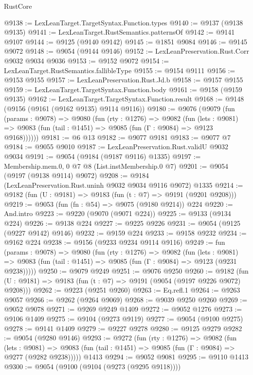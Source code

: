 \begin{lexlean}{RustCore}
\begin{coremodule}
@9138 := LexLeanTarget.TargetSyntax.Function.types
@9140 := @9137 (@9138 @9135)
@9141 := LexLeanTarget.RustSemantics.patternsOf
@9142 := @9141 @9107
@9144 := @9125 (@9140 @9142)
@9145 := @1851 @9084
@9146 := @9145 @9072
@9148 := @9054 (@9144 @9146)
@9152 := LexLeanPreservation.Rust.Corr @9032 @9034 @9036
@9153 := @9152 @9072
@9154 := LexLeanTarget.RustSemantics.fallibleType
@9155 := @9154 @9111
@9156 := @9153 @9155
@9157 := LexLeanPreservation.Rust.Jd.b
@9158 := @9157 @9155
@9159 := LexLeanTarget.TargetSyntax.Function.body
@9161 := @9158 (@9159 @9135)
@9162 := LexLeanTarget.TargetSyntax.Function.result
@9168 := @9148 (@9156 (@9161 (@9162 @9135) @9114 @9116))
@9180 := @9076
    (@9079
      (fun (params : @9078) =>
      @9080
        (fun (rty : @1276) =>
        @9082
          (fun (lets : @9081) =>
          @9083 (fun (tail : @1451) => @9085 (fun (Γ : @9084) => @9123 @9168))))))
@9181 := @6 @13
@9182 := @9077 @9181
@9183 := @9077 @7
@9184 := @9055 @9010
@9187 := LexLeanPreservation.Rust.validU @9032 @9034
@9191 := @9054 (@9184 (@9187 @9116) @1335)
@9197 := Membership.mem.{0, 0} @7 @8 (List.instMembership.{0} @7)
@9201 := @9054 (@9197 (@9138 @9114) @9072)
@9208 := @9184 (LexLeanPreservation.Rust.uninh @9032 @9034 @9116 @9072) @1335
@9214 := @9182 (fun (U : @9181) => @9183 (fun (t : @7) => @9191 (@9201 @9208)))
@9219 := @9053 (fun (fn : @54) => @9075 (@9180 @9214)) @224
@9220 := And.intro
@9223 := @9220 (@9070 (@9071 @224))
@9225 := @9133 (@9134 @224)
@9226 := @9138 @224
@9227 := @9225 @9226
@9231 := @9054 (@9125 (@9227 @9142) @9146)
@9232 := @9159 @224
@9233 := @9158 @9232
@9234 := @9162 @224
@9238 := @9156 (@9233 @9234 @9114 @9116)
@9249 := fun (params : @9078) =>
  @9080
    (fun (rty : @1276) =>
    @9082
      (fun (lets : @9081) =>
      @9083 (fun (tail : @1451) => @9085 (fun (Γ : @9084) => @9123 (@9231 @9238)))))
@9250 := @9079 @9249
@9251 := @9076 @9250
@9260 := @9182 (fun (U : @9181) => @9183 (fun (t : @7) => @9191 (@9054 (@9197 @9226 @9072) @9208)))
@9262 := @9223 (@9251 @9260)
@9263 := Eq.refl.{1}
@9264 := @9263 @9057
@9266 := @9262 (@9264 @9069)
@9268 := @9039 @9250 @9260
@9269 := @9052 @9078
@9271 := @9269 @9249 @1409
@9272 := @9052 @1276
@9273 := @9106 @1409
@9275 := @9104 (@9273 @9119)
@9277 := @9054 (@9100 @9275)
@9278 := @9141 @1409
@9279 := @9227 @9278
@9280 := @9125 @9279
@9282 := @9054 (@9280 @9146)
@9293 := @9272
    (fun (rty : @1276) =>
    @9082
      (fun (lets : @9081) =>
      @9083 (fun (tail : @1451) => @9085 (fun (Γ : @9084) => @9277 (@9282 @9238)))))
    @1413
@9294 := @9052 @9081
@9295 := @9110 @1413
@9300 := @9054 (@9100 (@9104 (@9273 (@9295 @9118))))

\end{coremodule}
\end{lexlean}
